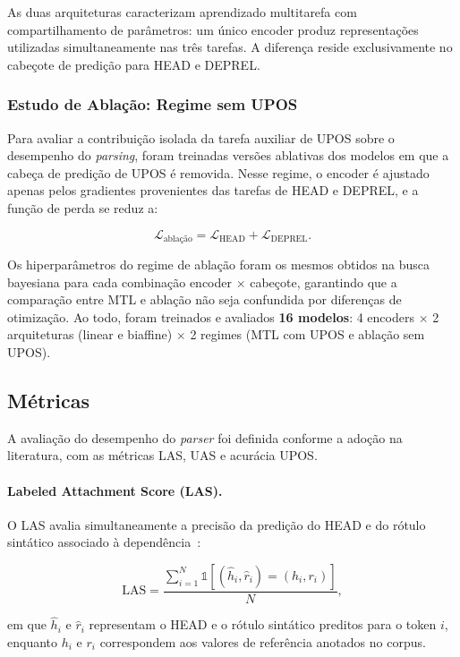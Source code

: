 As duas arquiteturas caracterizam aprendizado multitarefa com compartilhamento de parâmetros:
um único encoder produz representações utilizadas simultaneamente nas três tarefas. A diferença
reside exclusivamente no cabeçote de predição para HEAD e DEPREL.

\subsubsection*{Estudo de Ablação: Regime sem UPOS}

Para avaliar a contribuição isolada da tarefa auxiliar de UPOS sobre o desempenho do
\textit{parsing}, foram treinadas versões ablativas dos modelos em que a cabeça de predição
de UPOS é removida. Nesse regime, o encoder é ajustado apenas pelos gradientes provenientes
das tarefas de HEAD e DEPREL, e a função de perda se reduz a:

\[
\mathcal{L}_\text{ablação} = \mathcal{L}_{\text{HEAD}} + \mathcal{L}_{\text{DEPREL}}.
\]

Os hiperparâmetros do regime de ablação foram os mesmos obtidos na busca bayesiana para cada
combinação encoder $\times$ cabeçote, garantindo que a comparação entre MTL e ablação não seja
confundida por diferenças de otimização. Ao todo, foram treinados e avaliados \textbf{16
modelos}: 4 encoders $\times$ 2 arquiteturas (linear e biaffine) $\times$ 2 regimes (MTL com
UPOS e ablação sem UPOS).

\subsection*{Métricas}

A avaliação do desempenho do \textit{parser} foi definida conforme a adoção na literatura, com
as métricas LAS, UAS e acurácia UPOS.

\paragraph{Labeled Attachment Score (LAS).}
O LAS avalia simultaneamente a precisão da predição do HEAD e do rótulo sintático associado
à dependência~\citep{nivre2006labeled}:

\[
\text{LAS} =
\frac{
\sum_{i=1}^{N}
\mathbb{1}
[(\hat{h}_i,\hat{r}_i)=(h_i,r_i)]
}
{N},
\]

em que $\hat{h}_i$ e $\hat{r}_i$ representam o HEAD e o rótulo sintático preditos para o
token $i$, enquanto $h_i$ e $r_i$ correspondem aos valores de referência anotados no corpus.

